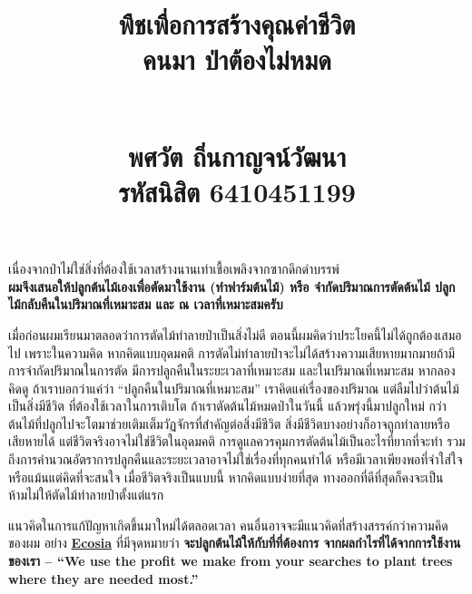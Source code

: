 \documentclass{article}
\title{\flushleft\Large พืชเพื่อการสร้างคุณค่าชีวิต\\
\Huge\textbf{คนมา {\color{green}ป่าต้องไม่หมด}}\\
\rule{0em}{1ex}\\
\normalsize พศวัต ถิ่นกาญจน์วัฒนา\\
รหัสนิสิต 6410451199
\vspace{-8ex}}
\author{}
\date{}
\begin{document}
\maketitle
\sloppy\flushleft

เนื่องจากป่าไม่ใช่สิ่งที่ต้องใช้เวลาสร้างนานเท่าเชื้อเพลิงจากซากดึกดำบรรพ์\\
\textbf{ผมจึงเสนอให้ปลูกต้นไม้เองเพื่อตัดมาใช้งาน (ทำฟาร์มต้นไม้) หรือ จำกัดปริมาณการตัดต้นไม้ ปลูกไม้กลับคืนในปริมาณที่เหมาะสม และ ณ เวลาที่เหมาะสมครับ}

\rule{0em}{1ex}

เมื่อก่อนผมเรียนมาตลอดว่าการตัดไม้ทำลายป่าเป็นสิ่งไม่ดี ตอนนี้ผมคิดว่าประโยคนี้ไม่ได้ถูกต้องเสมอไป
เพราะในความคิด หากคิดแบบอุดมคติ การตัดไม่ทำลายป่าจะไม่ได้สร้างความเสียหายมากมายถ้ามีการจำกัดปริมาณในการตัด มีการปลูกคืนในระยะเวลาที่เหมาะสม
และในปริมาณที่เหมาะสม หากลองคิดดู ถ้าเราบอกว่าแค่ว่า ``ปลูกคืนในปริมาณที่เหมาะสม'' เราคิดแค่เรื่องของปริมาณ แต่ลืมไปว่าต้นไม้เป็นสิ่งมีชีวิต
ที่ต้องใช้เวลาในการเติบโต ถ้าเราตัดต้นไม้หมดป่าในวันนี้ แล้วพรุ่งนี้มาปลูกใหม่ กว่าต้นไม้ที่ปลูกไปจะโตมาช่วยเติมเต็มวัฏจักรที่สำคัญต่อสิ่งมีชีวิต
สิ่งมีชีวิตบางอย่างก็อาจถูกทำลายหรือเสียหายได้ แต่ชีวิตจริงอาจไม่ใช่ชีวิตในอุดมคติ การดูแลควรคุมการตัดต้นไม้เป็นอะไรที่ยากที่จะทำ
รวมถึงการคำนวณอัตราการปลูกคืนและระยะเวลาอาจไม่ใช่เรื่องที่ทุกคนทำได้ หรือมีเวลาเพียงพอที่จำใส่ใจ หรือแม้นแต่คิดที่จะสนใจ
เมื่อชีวิตจริงเป็นแบบนี้ หากคิดแบบง่ายที่สุด ทางออกที่ดีที่สุดก็คงจะเป็น ห้ามไม่ให้ตัดไม้ทำลายป่าตั้งแต่แรก

\rule{0em}{1ex}

แนวคิดในการแก้ปัญหาเกิดขึ้นมาใหม่ได้ตลอดเวลา คนอื่นอาจจะมีแนวคิดที่สร้างสรรค์กว่าความคิดของผม อย่าง \href{https://www.ecosia.org/}{\textbf{Ecosia}} ที่มีจุดหมายว่า
\textbf{จะปลูกต้นไม้ให้กับที่ที่ต้องการ จากผลกำไรที่ได้จากการใช้งานของเรา -- ``We use the profit we make from your searches to plant trees where they are needed most.''}\footnotemark[1]

\end{document}
